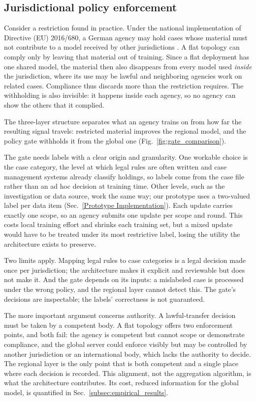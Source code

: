 \subsection{Jurisdictional policy enforcement}
\label{subsec:policy_enforcement}


Consider a restriction found in practice. Under the national implementation of Directive (EU) 2016/680, a German agency may hold cases whose material must not contribute to a model received by other jurisdictions \citep{directive2016680}. A flat topology can comply only by leaving that material out of training. Since a flat deployment has one shared model, the material then also disappears from every model used \emph{inside} the jurisdiction, where its use may be lawful and neighboring agencies work on related cases. Compliance thus discards more than the restriction requires. The withholding is also invisible: it happens inside each agency, so no agency can show the others that it complied.

The three-layer structure separates what an agency trains on from how far the resulting signal travels: restricted material improves the regional model, and the policy gate withholds it from the global one (Fig.~\ref{fig:gate_comparison}).

The gate needs labels with a clear origin and granularity. One workable choice is the case category, the level at which legal rules are often written and case management systems already classify holdings, so labels come from the case file rather than an ad hoc decision at training time. Other levels, such as the investigation or data source, work the same way; our prototype uses a two-valued label per data item (Sec.~\ref{Prototype Implementation}). Each update carries exactly one scope, so an agency submits one update per scope and round. This costs local training effort and shrinks each training set, but a mixed update would have to be treated under its most restrictive label, losing the utility the architecture exists to preserve.

Two limits apply. Mapping legal rules to case categories is a legal decision made once per jurisdiction; the architecture makes it explicit and reviewable but does not make it. And the gate depends on its inputs: a mislabeled case is processed under the wrong policy, and the regional layer cannot detect this. The gate's decisions are inspectable; the labels' correctness is not guaranteed.

The more important argument concerns authority. A lawful-transfer decision must be taken by a competent body. A flat topology offers two enforcement points, and both fail: the agency is competent but cannot scope or demonstrate compliance, and the global server could enforce visibly but may be controlled by another jurisdiction or an international body, which lacks the authority to decide. The regional layer is the only point that is both competent and a single place where each decision is recorded. This alignment, not the aggregation algorithm, is what the architecture contributes. Its cost, reduced information for the global model, is quantified in Sec.~\ref{subsec:empirical_results}.

